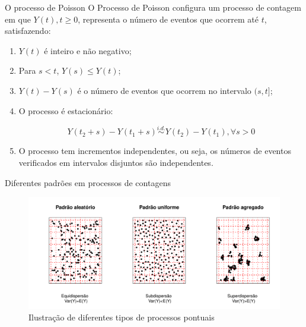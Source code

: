 \begin{frame}{O processo de Poisson}
O Processo de Poisson configura um processo de contagem em que 
$Y(t),t\geqslant 0$, representa o número de eventos que ocorrem até $t$, 
satisfazendo:
\vspace{0,5cm}
\begin{enumerate}
  \item $Y(t)$ é inteiro e não negativo;
  \item Para $s<t$, $Y(s)\leq Y(t)$;
  \item $Y(t)-Y(s)$ é o número de eventos que ocorrem no intervalo $(s,t]$;
\item O processo é estacionário:

$$
  Y(t_{2}+s)-Y(t_{1}+s) \overset{i.d. }{\sim}Y(t_{2})-Y(t_{1}), \forall s>0
$$
  
\item O processo tem incrementos independentes, ou seja, os números de 
eventos verificados em intervalos disjuntos são independentes.
\end{enumerate}

\end{frame}

\begin{frame}{Diferentes padrões em processos de contagens}

\begin{figure}[h]
\includegraphics[scale=0.6]{images/processos14.pdf}
\caption{Ilustração de diferentes tipos de processos pontuais}
\label{Fig2}
\centering

\end{figure}
\end{frame}

